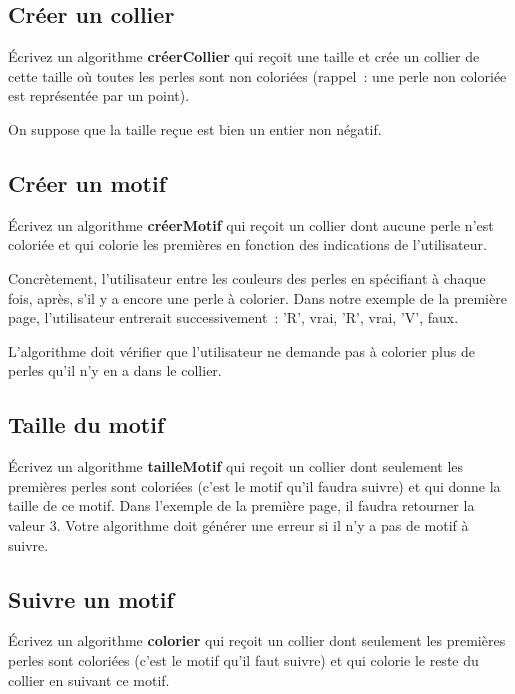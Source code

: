 		\subsection*{Créer un collier}
		
			Écrivez un algorithme \textbf{créerCollier}
			qui reçoit une taille et crée un collier de cette taille
			où toutes les perles sont non coloriées
			(rappel~: une perle non coloriée est représentée par un point).
			
			On suppose que la taille reçue est bien un entier non négatif.
	
		\subsection*{Créer un motif}
		
			Écrivez un algorithme \textbf{créerMotif}
			qui reçoit un collier dont aucune perle n’est coloriée
			et qui colorie les premières en fonction des indications
			de l’utilisateur.
			
			Concrètement,
			l’utilisateur entre les couleurs des perles
			en spécifiant à chaque fois, après,
			s’il y a encore une perle à colorier.
			Dans notre exemple de la première page,
			l’utilisateur entrerait successivement~:
			'R', vrai, 'R', vrai, 'V', faux. 
			
			L’algorithme doit vérifier que l’utilisateur
			ne demande pas à colorier plus de perles
			qu’il n’y en a dans le collier.
	
		\subsection*{Taille du motif}
	
			Écrivez un algorithme \textbf{tailleMotif}
			qui reçoit un collier dont seulement les premières perles sont coloriées
			(c’est le motif qu’il faudra suivre)
			et qui donne la taille de ce motif.
			Dans l’exemple de la première page, il faudra retourner la valeur 3.
			Votre algorithme doit générer une erreur si il n’y a pas de motif à suivre.
	
		\subsection*{Suivre un motif}
		
			Écrivez un algorithme \textbf{colorier}
			qui reçoit un collier dont seulement les premières perles sont coloriées
			(c’est le motif qu’il faut suivre)
			et qui colorie le reste du collier en suivant ce motif.
			

